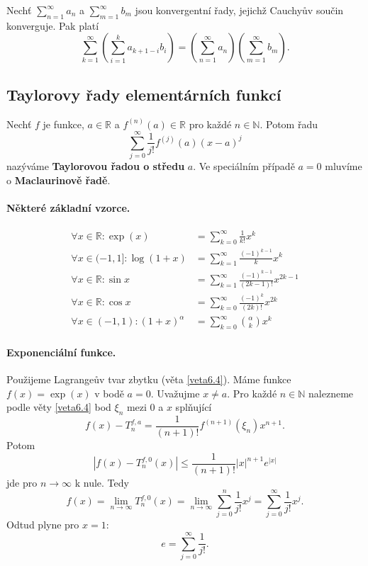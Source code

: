 \begin{veta}[Abel] \label{veta7.16}
Nechť $\sum_{n=1}^{\infty} a_n$ a $\sum_{m=1}^{\infty} b_m$ jsou konvergentní řady, jejichž Cauchyův součin konverguje. Pak platí
\[
\sum_{k=1}^{\infty} \left( \sum_{i=1}^{k} a_{k+1-i} b_i \right)
=
\left( \sum_{n=1}^{\infty} a_n \right)
\left( \sum_{m=1}^{\infty} b_m \right).
\]
\end{veta}

\subsection{Taylorovy řady elementárních funkcí}
\begin{definice}
Nechť $f$ je funkce, $a \in \mathbb{R}$ a $f^{(n)}(a) \in \mathbb{R}$ pro každé $n \in \mathbb{N}$. Potom řadu
\[
\sum_{j=0}^{\infty} \frac{1}{j!} f^{(j)}(a)(x-a)^j
\]
nazýváme \textbf{Taylorovou řadou o středu} $a$. Ve speciálním případě $a=0$ mluvíme o \textbf{Maclaurinově řadě}.
\end{definice}

\paragraph{Některé základní vzorce.}
\begin{align*}
\forall x \in \mathbb{R}: \exp (x) &= \sum_{k=0}^{\infty} \frac{1}{k!} x^k\\
\forall x \in (-1,1]: \log(1+x) &= \sum_{k=1}^{\infty} \frac{(-1)^{k-1}}{k} x^k\\
\forall x \in \mathbb{R}: \sin x &= \sum_{k=1}^{\infty} \frac{(-1)^{k-1}}{(2k-1)!} x^{2k-1}\\
\forall x \in \mathbb{R}: \cos x &= \sum_{k=0}^{\infty} \frac{(-1)^k}{(2k)!} x^{2k} \\
\forall x \in (-1,1):(1+x)^\alpha &= \sum_{k=0}^{\infty} \binom{\alpha}{k} x^k
\end{align*}


\paragraph{Exponenciální funkce.} Použijeme Lagrangeův tvar zbytku (věta \ref{veta6.4}). Máme funkce
$f(x)=\exp (x)$ v bodě $a=0$. Uvažujme $x\ne a$. Pro každé $n \in \mathbb N $ nalezneme podle
věty \ref{veta6.4} bod $\xi _n$ mezi 0 a $x$ splňující
$$
    f(x)-T_n^{f,a}=\frac{1}{(n+1)!}f^{(n+1)}(\xi_n)x^{n+1}.
$$
Potom
$$
    |f(x)-T_n^{f,0}(x)| \leq  \frac{1}{(n+1)!}|x|^{n+1}e^{|x|}
$$
jde pro $n \to \infty$ k nule. Tedy
$$
    f(x) = \lim_{n \to \infty} T_n^{f,0}(x) = \lim_{n \to \infty} \sum_{j=0}^n \frac{1}{j!}x^j = \boxed{\sum_{j=0}^\infty \frac{1}{j!}x^j}.
$$
Odtud plyne pro $x=1$:
$$
    e = \sum_{j=0}^\infty \frac{1}{j!}.
$$
